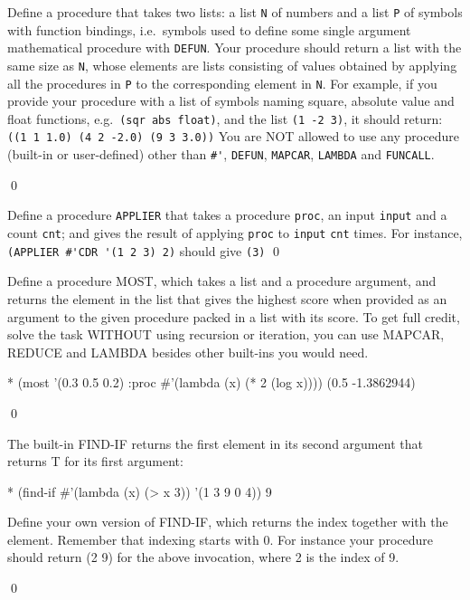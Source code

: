 \documentclass[a4paper,11pt]{article}
\begin{document}
\begin{uexercise}
Define a procedure that takes two lists: a list \Verb+N+ of numbers and a list \Verb+P+ of symbols with function bindings, i.e.\ symbols used to define some single argument mathematical procedure with \Verb+DEFUN+. Your procedure should return a list with the same size as \Verb+N+, whose elements are lists consisting of values obtained by applying all the procedures in \Verb+P+ to the corresponding element in \Verb+N+. For example, if you provide your procedure with a list of symbols naming square, absolute value and float functions, e.g.\ \Verb+(sqr abs float)+, and the list \Verb+(1 -2 3)+, it should return: \Verb+((1 1 1.0) (4 2 -2.0) (9 3 3.0))+ You are NOT allowed to use any procedure (built-in or user-defined) other than \Verb+#'+, \Verb+DEFUN+, \Verb+MAPCAR+, \Verb+LAMBDA+ and \Verb+FUNCALL+.

\qed
\end{uexercise}

\begin{uexercise}

Define a procedure \Verb+APPLIER+ that takes a procedure \Verb+proc+, an input \Verb+input+ and a count \Verb+cnt+; and gives the result of applying \Verb+proc+ to \Verb+input+ \Verb+cnt+ times. For instance, \Verb+(APPLIER #'CDR '(1 2 3) 2)+ should give \Verb+(3)+
\qed
\end{uexercise}

\begin{uexercise}

Define a procedure MOST, which takes a list and a procedure argument, and returns the element in the list that gives the highest score when provided as an argument to the given procedure packed in a list with its score. To get full credit, solve the task WITHOUT using recursion or iteration, you can use MAPCAR, REDUCE and LAMBDA besides other built-ins you would need.

\begin{lispcode}
* (most '(0.3 0.5 0.2) :proc #'(lambda (x) (* 2 (log x))))
(0.5 -1.3862944)
\end{lispcode}

\qed
\end{uexercise}

\begin{uexercise}
The built-in FIND-IF returns the first element in its second argument that returns T for its first argument:

\begin{lispcode}
* (find-if #'(lambda (x) (> x 3)) '(1 3 9 0 4))
9
\end{lispcode}

Define your own version of FIND-IF, which returns the index together with the element. Remember
that indexing starts with 0. For instance your procedure should return (2 9) for the above invocation,
where 2 is the index of 9. 

\qed
\end{uexercise}
\end{document}
